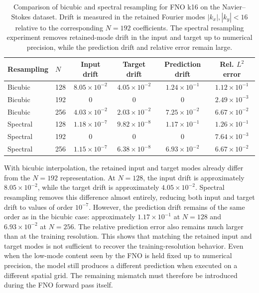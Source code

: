 \begin{table}
\centering
\begin{tabular}{llcccc}
\toprule
Resampling & \(N\) & Input drift & Target drift & Prediction drift & Rel. \(L^2\) error \\
\midrule
Bicubic & 128 & \(8.05\times10^{-2}\) & \(4.05\times10^{-2}\) & \(1.24\times10^{-1}\) & \(1.12\times10^{-1}\) \\
Bicubic & 192 & \(0\)                 & \(0\)                 & \(0\)                 & \(2.49\times10^{-3}\) \\
Bicubic & 256 & \(4.03\times10^{-2}\) & \(2.03\times10^{-2}\) & \(7.25\times10^{-2}\) & \(6.67\times10^{-2}\) \\
\midrule
Spectral & 128 & \(1.18\times10^{-7}\) & \(9.82\times10^{-8}\) & \(1.17\times10^{-1}\) & \(1.26\times10^{-1}\) \\
Spectral & 192 & \(0\)                 & \(0\)                 & \(0\)                 & \(7.64\times10^{-3}\) \\
Spectral & 256 & \(1.15\times10^{-7}\) & \(6.38\times10^{-8}\) & \(6.93\times10^{-2}\) & \(6.67\times10^{-2}\) \\
\bottomrule
\end{tabular}
\caption{Comparison of bicubic and spectral resampling for FNO k16 on the Navier--Stokes dataset. Drift is measured in the retained Fourier modes \(|k_x|,|k_y|<16\) relative to the corresponding \(N=192\) coefficients. The spectral resampling experiment removes retained-mode drift in the input and target up to numerical precision, while the prediction drift and relative error remain large.}
\label{tab:fno_spectral_resampling}
\end{table}

With bicubic interpolation, the retained input and target modes already differ from the \(N=192\) representation. At \(N=128\), the input drift is approximately \(8.05\times10^{-2}\), while the target drift is approximately \(4.05\times10^{-2}\). Spectral resampling removes this difference almost entirely, reducing both input and target drift to values of order \(10^{-7}\). However, the prediction drift remains of the same order as in the bicubic case: approximately \(1.17\times10^{-1}\) at \(N=128\) and \(6.93\times10^{-2}\) at \(N=256\). The relative prediction error also remains much larger than at the training resolution. This shows that matching the retained input and target modes is not sufficient to recover the training-resolution behavior. Even when the low-mode content seen by the FNO is held fixed up to numerical precision, the model still produces a different prediction when executed on a different spatial grid. The remaining mismatch must therefore be introduced during the FNO forward pass itself.


